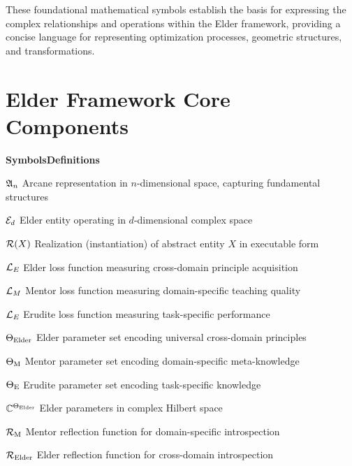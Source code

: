 \vspace{1cm}
\begin{center}
These foundational mathematical symbols establish the basis for expressing the complex relationships and operations within the Elder framework, providing a concise language for representing optimization processes, geometric structures, and transformations.
\end{center}

\clearpage
\chapter*{Elder Framework Core Components}

\begin{multicols}{2}
\noindent\textbf{\large Symbols}\hfill\textbf{\large Definitions}

\vspace{0.3cm}
\noindent$\mathfrak{A}_{n}$ \dotfill Arcane representation in $n$-dimensional space, capturing fundamental structures

\noindent$\mathcal{E}_{d}$ \dotfill Elder entity operating in $d$-dimensional complex space

\noindent$\mathcal{R}(X)$ \dotfill Realization (instantiation) of abstract entity $X$ in executable form

\noindent$\mathcal{L}_E$ \dotfill Elder loss function measuring cross-domain principle acquisition

\noindent$\mathcal{L}_M$ \dotfill Mentor loss function measuring domain-specific teaching quality

\noindent$\mathcal{L}_E$ \dotfill Erudite loss function measuring task-specific performance

\noindent$\Theta_{\text{Elder}}$ \dotfill Elder parameter set encoding universal cross-domain principles

\noindent$\Theta_{\text{M}}$ \dotfill Mentor parameter set encoding domain-specific meta-knowledge

\noindent$\Theta_{\text{E}}$ \dotfill Erudite parameter set encoding task-specific knowledge

\noindent$\mathbb{C}^{\Theta_{\text{Elder}}}$ \dotfill Elder parameters in complex Hilbert space

\noindent$\mathcal{R}_{\text{M}}$ \dotfill Mentor reflection function for domain-specific introspection

\noindent$\mathcal{R}_{\text{Elder}}$ \dotfill Elder reflection function for cross-domain introspection


\end{multicols}

